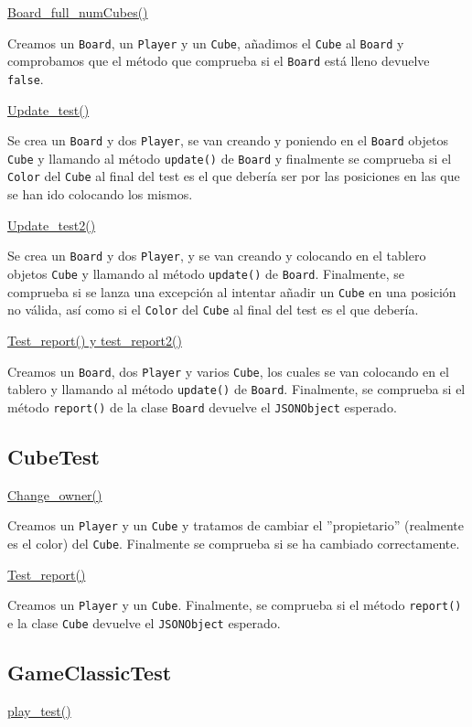 \documentclass[../DocumentoOficial.tex]{subfiles}
\begin{document}
\underline{Board\_full\_numCubes()}

Creamos un \texttt{Board}, un \texttt{Player} y un \texttt{Cube}, añadimos el \texttt{Cube} al \texttt{Board} y comprobamos que el método que comprueba si el \texttt{Board} está lleno devuelve \texttt{false}.

\underline{Update\_test()}

Se crea un \texttt{Board} y dos \texttt{Player}, se van creando y poniendo en el \texttt{Board} objetos \texttt{Cube} y llamando al método \texttt{update()} de \texttt{Board} y finalmente se comprueba si el \texttt{Color} del \texttt{Cube} al final del test es el que debería ser por las posiciones en las que se han ido colocando los mismos.

\underline{Update\_test2()}

Se crea un \texttt{Board} y dos \texttt{Player}, y se van creando y colocando en el tablero objetos \texttt{Cube} y llamando al método \texttt{update()} de \texttt{Board}. Finalmente, se comprueba si se lanza una excepción al intentar añadir un \texttt{Cube} en una posición no válida, así como si el \texttt{Color} del \texttt{Cube} al final del test es el que debería.

\underline{Test\_report() y test\_report2()}

Creamos un \texttt{Board}, dos \texttt{Player} y varios \texttt{Cube}, los cuales se van colocando en el tablero y llamando al método \texttt{update()} de \texttt{Board}. Finalmente, se comprueba si el método \texttt{report()} de la clase \texttt{Board} devuelve el \texttt{JSONObject} esperado.

\subsection{CubeTest}
\underline{Change\_owner()}

Creamos un \texttt{Player} y un \texttt{Cube} y tratamos de cambiar el ''propietario'' (realmente es el color) del \texttt{Cube}. Finalmente se comprueba si se ha cambiado correctamente.

\underline{Test\_report()}

Creamos un \texttt{Player} y un \texttt{Cube}. Finalmente, se comprueba si el método \texttt{report()} e la clase \texttt{Cube} devuelve el \texttt{JSONObject} esperado.


\subsection{GameClassicTest}
\underline{play\_test()}
\end{document}
